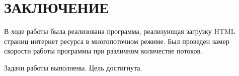 \chapter*{ЗАКЛЮЧЕНИЕ}

В ходе работы была реализована программа, реализующая загрузку HTML страниц интернет ресурса в многопоточном режиме. Был проведен замер скорости работы программы при различном количестве потоков.

Задачи работы выполнены. Цель достигнута.
